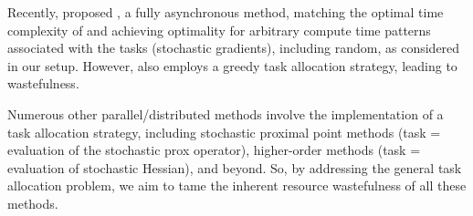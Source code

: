 Recently, \citet{maranjyan2025ringmasterasgdasynchronoussgd} proposed , a fully asynchronous  method, matching the optimal time complexity of  and achieving optimality for arbitrary compute time patterns associated with the tasks (stochastic gradients), including random, as considered in our setup. However,  also employs a greedy task allocation strategy, leading to wastefulness.

Numerous other parallel/distributed methods involve the implementation of a task allocation strategy, including stochastic proximal point methods (task = evaluation of the stochastic prox operator), higher-order methods (task = evaluation of stochastic Hessian), and beyond. So, by addressing the general task allocation problem, we aim to tame the inherent resource wastefulness of all these methods.









%
%


%
%
%
%
%


